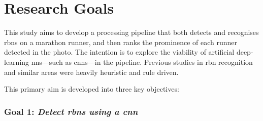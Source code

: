 \section{Research Goals}
\label{sec:introduction:research_goals}

This study aims to develop a processing pipeline that both detects and recognises \glspl{rbn} on a marathon runner, and then ranks the prominence of each runner detected in the photo. The intention is to explore the viability of artificial deep-learning \glspl{nn}---such as \glspl{cnn}---in the pipeline. Previous studies in \gls{rbn} recognition \citep{Benami:2012jf} and similar areas \citep{Kundu:2015vq, Eichner:2008dw, Torresen:2004jl} were heavily heuristic and rule driven.

This primary aim is developed into three key objectives:




\subsubsection*{Goal 1: \itshape Detect \glspl{rbn} using a \gls{cnn}}

